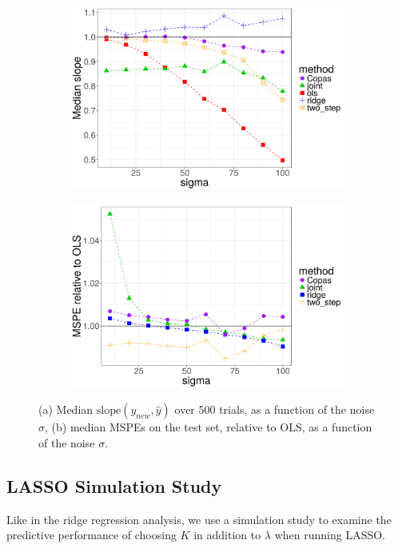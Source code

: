 \documentclass[main]{subfiles}
\begin{document}
\begin{figure}[!h]
	\centering
	\begin{subfigure}[t]{0.45\textwidth}
		\includegraphics[width = \textwidth]{./ridge_figures/slopes_over_sigmas.png}
	\end{subfigure}
  \begin{subfigure}[t]{0.45\textwidth}
    \includegraphics[width = \textwidth]{./ridge_figures/mspe_over_sigmas.png}
  \end{subfigure}
  \caption{(a) Median $\text{slope}(y_{new}, \hat y)$ over 500 trials, as a function of the noise $\sigma$, (b)
	median MSPEs on the test set, relative to OLS, as a function of the noise $\sigma$.  }
	\label{fig:ridge_results_varying_sigma}
\end{figure}


\subsection{LASSO Simulation Study}
Like in the ridge regression analysis,
we use a simulation study to examine the predictive performance of choosing $K$ in addition to $\lambda$ when running
LASSO.
\end{document}
